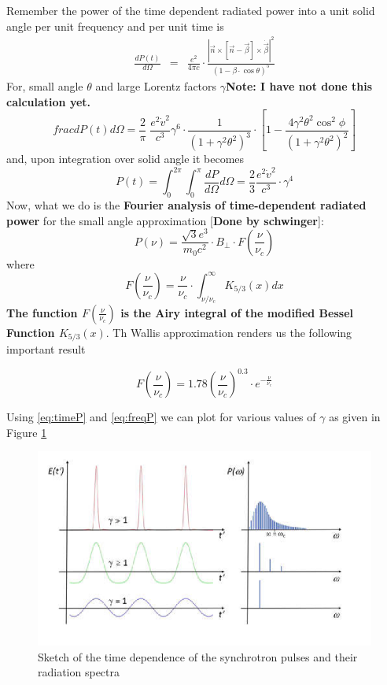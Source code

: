 \documentclass[11pt]{report}
\newcommand{\tbf}[1]{\textbf{#1}}
\newcommand{\de}[2]{\frac{d{#1}}{d{#2}}}
\newcommand{\cbox}{tcolorbox}
\newcommand{\cc}[1]{\left({#1}\right)}
\newcommand{\rr}[1]{\left[{#1}\right]}
\newcommand{\vd}[1]{\dot{\vec{#1}}}
\begin{document}
Remember the power of the time dependent radiated power into a unit solid angle per unit frequency and per unit time is
\begin{align}
\frac{dP(t)}{d\Omega}&=&\frac{e^2}{4 \pi c}\cdot \frac{|\vec{n}\times\rr{\vec{n}-\vec{\beta}}\times\vd{\beta}|^2}{(1-\beta \cdot \cos \theta)^5}
\end{align}
For, small angle $\theta$ and large Lorentz factors $\gamma$\textbf{Note: I have not done this calculation yet.}
\begin{equation}
frac{dP(t)}{d\Omega}=\frac{2}{\pi}\;\frac{e^2 \dot{v}^2}{c^3} \gamma^6\cdot \frac{1}{(1+\gamma^2 \theta^2)^3}\cdot \rr{1-\frac{4 \gamma^2 \theta^2 \cos^2 \phi}{(1+\gamma^2\theta^2)^2}}
\end{equation}
and, upon integration over solid angle it becomes
\begin{equation}\label{eq:timeP}
P(t)=\int^{2 \pi}_0 \int^{\pi}_0 \de{P}{\Omega}d\Omega=\frac{2}{3}\frac{e^2\dot{v}^2}{c^3}\cdot\gamma^4
\end{equation}
Now, what we do is the \tbf{Fourier analysis of time-dependent radiated power} for the small angle approximation [\textbf{Done by schwinger}]:
\begin{equation}
P(\nu)=\frac{\sqrt{3}e^3}{m_0 c^2} \cdot B_{\perp} \cdot F\cc{\frac{\nu}{\nu_c}}
\end{equation}
where
\begin{equation}\label{eq:freqP}
F\cc{\frac{\nu}{\nu_c}}=\frac{\nu}{\nu_c}\cdot \int^\infty_{\nu/\nu_c} K_{5/3}(x)dx
\end{equation}
\textbf{The function $F\cc{\frac{\nu}{\nu_c}}$ is the Airy integral of the modified Bessel Function $K_{5/3}(x)$}. Th Wallis approximation renders us the following important result
\begin{\cbox}

\begin{equation}
F\cc{\frac{\nu}{\nu_c}}=1.78 \cc{\frac{\nu}{\nu_c}}^{0.3} \cdot e^{-\frac{\nu}{\nu_c}} 
\end{equation}
\end{\cbox}
Using \eqref{eq:timeP} and \eqref{eq:freqP} we can plot for various values of $\gamma$ as given in Figure \ref{figfour}

\begin{figure}\label{figfour}
\includegraphics[scale=1]{figfour.png}
\caption{Sketch of the time dependence of the synchrotron pulses and their radiation spectra}
\end{figure}
\end{document}
